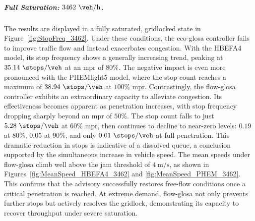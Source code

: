 \subparagraph*{Full Saturation: $3462~\unit{\veh\per\hour}$.}
The results are displayed in a fully saturated, gridlocked state in Figure~\vref{fig:StopFreq_3462}. Under these conditions, the \ac{eco-glosa} controller fails to improve traffic flow and instead exacerbates congestion. With the HBEFA4 model, its stop frequency shows a generally increasing trend, peaking at $35.14~\unit{\stops\per\veh}$ at an \ac{mpr} of $80\%$. The negative impact is even more pronounced with the PHEMlight5 model, where the stop count reaches a maximum of $38.94~\unit{\stops\per\veh}$ at $100\%$ \ac{mpr}.
\mynewline
Contrastingly, the \ac{flow-glosa} controller exhibits an extraordinary capacity to alleviate congestion. Its effectiveness becomes apparent as penetration increases, with stop frequency dropping sharply beyond an \ac{mpr} of $50\%$. The stop count falls to just $5.28~\unit{\stops\per\veh}$ at $60\%$ \ac{mpr}, then continues to decline to near-zero levels: $0.19$ at $80\%$, $0.05$ at $90\%$, and only $0.01~\unit{\stops\per\veh}$ at full penetration.
\mynewline
This dramatic reduction in stops is indicative of a dissolved queue, a conclusion supported by the simultaneous increase in vehicle speed. The mean speeds under \ac{flow-glosa} climb well above the jam threshold of $4~\unit{\metre\per\second}$, as shown in Figures~\vref{fig:MeanSpeed_HBEFA4_3462} and \vref{fig:MeanSpeed_PHEM_3462}. This confirms that the advisory successfully restores free-flow conditions once a critical penetration is reached. At extreme demand, \ac{flow-glosa} not only prevents further stops but actively resolves the gridlock, demonstrating its capacity to recover throughput under severe saturation.

